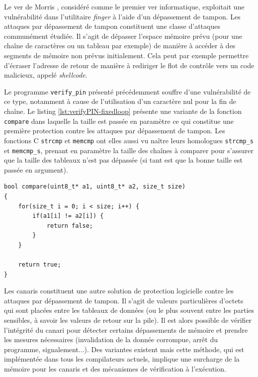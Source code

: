         Le ver de Morris \cite{morirs-worm}, considéré comme le premier \og ver \fg{} informatique, exploitait une vulnérabilité dans l'utilitaire \textit{finger} à l'aide d'un dépassement de tampon. Les attaques par dépassement de tampon constituent une classe d'attaques communément étudiée. Il s'agit de dépasser l'espace mémoire prévu (pour une chaîne de caractères ou un tableau par exemple) de manière à accéder à des segments de mémoire non prévus initialement. Cela peut par exemple permettre d'écraser l'adresse de retour de manière à rediriger le flot de contrôle vers un code malicieux, appelé \textit{shellcode}.
        
        Le programme \texttt{verify\_pin} présenté précédemment souffre d'une vulnérabilité de ce type, notamment à cause de l'utilisation d'un caractère nul pour la fin de chaîne. Le listing \ref{lst:verifyPIN-fixedloop} présente une variante de la fonction \texttt{compare} dans laquelle la taille est passée en paramètre ce qui constitue une première protection contre les attaques par dépassement de tampon. Les fonctions C \texttt{strcmp} et \texttt{memcmp} ont elles aussi vu naître leurs homologues \texttt{strcmp\_s} et \texttt{memcmp\_s}, prenant en paramètre la taille des chaînes à comparer pour s'assurer que la taille des tableaux n'est pas dépassée (si tant est que la bonne taille est passée en argument).
      
\begin{lstlisting}  
bool compare(uint8_t* a1, uint8_t* a2, size_t size)
{
    for(size_t i = 0; i < size; i++) {
        if(a1[i] != a2[i]) {
            return false;
        }
    }
    
    return true;
}
\end{lstlisting}  

        Les canaris constituent une autre solution de protection logicielle contre les attaques par dépassement de tampon. Il s'agit de valeurs particulières d'octets qui sont placées entre les tableaux de données (ou le plus souvent entre les parties sensibles, à savoir les valeurs de retour sur la pile). Il est alors possible de vérifier l'intégrité du canari pour détecter certains dépassements de mémoire et prendre les mesures nécessaires (invalidation de la donnée corrompue, arrêt du programme, signalement...). Des variantes existent mais cette méthode, qui est implémentée dans tous les compilateurs actuels, implique une surcharge de la mémoire pour les canaris et des mécanismes de vérification à l'exécution. 
        
